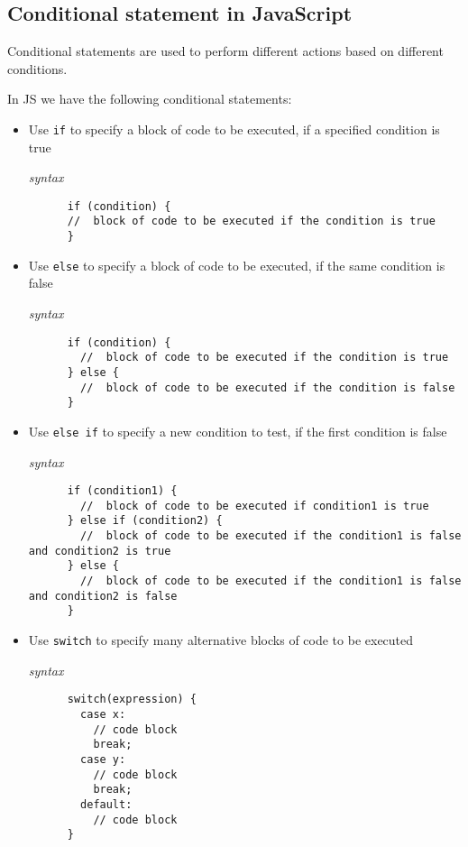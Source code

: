 \documentclass[a4paper]{article}
\begin{document}
  \subsection{Conditional statement in JavaScript}%
  Conditional statements are used to perform different actions
  based on different conditions.

  In JS we have the following conditional statements:
  \begin{itemize}
    \item Use \texttt{if} to specify a block of code to be 
      executed, if a specified condition is true

      \textit{syntax}
      \begin{lstlisting}
      if (condition) {
      //  block of code to be executed if the condition is true
      }
      \end{lstlisting}
    \item Use \texttt{else} to specify a block of code to be 
      executed, if the same condition is false

      \textit{syntax}
      \begin{lstlisting}
      if (condition) {
        //  block of code to be executed if the condition is true
      } else {
        //  block of code to be executed if the condition is false
      }
      \end{lstlisting}
    \item Use \texttt{else if} to specify a new condition to test, 
      if the first condition is false

      \textit{syntax}
      \begin{lstlisting}
      if (condition1) {
        //  block of code to be executed if condition1 is true
      } else if (condition2) {
        //  block of code to be executed if the condition1 is false and condition2 is true
      } else {
        //  block of code to be executed if the condition1 is false and condition2 is false
      }
      \end{lstlisting}
    \item Use \texttt{switch} to specify many alternative blocks 
      of code to be executed
      
      \textit{syntax}
      \begin{lstlisting}
      switch(expression) {
        case x:
          // code block
          break;
        case y:
          // code block
          break;
        default:
          // code block
      }
      \end{lstlisting}
  \end{itemize}%
\end{document}
